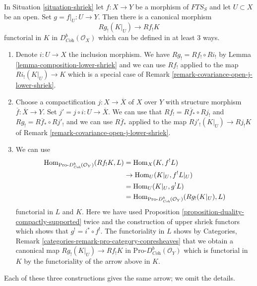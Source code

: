 \begin{remark}
\label{remark-covariance-open-lower-shriek}
In Situation \ref{situation-shriek} let $f : X \to Y$ be a morphism of
$\textit{FTS}_S$ and let $U \subset X$ be an open. Set
$g = f|_U : U \to Y$. Then there is a canonical morphism
$$
Rg_!(K|_U) \longrightarrow Rf_!K
$$
functorial in $K$ in $D^b_{\textit{Coh}}(\mathcal{O}_X)$
which can be defined in at least 3 ways.
\begin{enumerate}
\item Denote $i : U \to X$ the inclusion morphism. We have
$Rg_! = Rf_! \circ Ri_!$ by
Lemma \ref{lemma-composition-lower-shriek}
and we can use $Rf_!$ applied to the map $Ri_!(K|_U) \to K$
which is a special case of
Remark \ref{remark-covariance-open-j-lower-shriek}.
\item Choose a compactification $j : X \to \overline{X}$
of $X$ over $Y$ with structure morphism $\overline{f} : \overline{X} \to Y$.
Set $j' = j \circ i : U \to \overline{X}$. We can
use that $Rf_! = R\overline{f}_* \circ Rj_!$ and
$Rg_! = R\overline{f}_* \circ Rj'_!$
and we can use $R\overline{f}_*$ applied to the map
$Rj'_!(K|_U) \to Rj_!K$ of
Remark \ref{remark-covariance-open-j-lower-shriek}.
\item We can use
\begin{align*}
\mathop{\mathrm{Hom}}\nolimits_{\text{Pro-}D^b_{\textit{Coh}}(\mathcal{O}_Y)}(Rf_!K, L)
& =
\mathop{\mathrm{Hom}}\nolimits_X(K, f^!L) \\
& \to
\mathop{\mathrm{Hom}}\nolimits_U(K|_U, f^!L|_U) \\
& =
\mathop{\mathrm{Hom}}\nolimits_U(K|_U, g^!L) \\
& =
\mathop{\mathrm{Hom}}\nolimits_{\text{Pro-}D^b_{\textit{Coh}}(\mathcal{O}_Y)}(Rg_!(K|_U), L)
\end{align*}
functorial in $L$ and $K$. Here we have used
Proposition \ref{proposition-duality-compactly-supported}
twice and the construction of upper shriek functors which
shows that $g^! = i^* \circ f^!$. The functoriality in $L$ shows by
Categories, Remark \ref{categories-remark-pro-category-copresheaves}
that we obtain a canonical map $Rg_!(K|_U) \to Rf_!K$ in
$\text{Pro-}D^b_{\textit{Coh}}(\mathcal{O}_Y)$ which is
functorial in $K$ by the functoriality of the arrow above in $K$.
\end{enumerate}
Each of these three constructions gives the same arrow; we omit the
details.
\end{remark}

